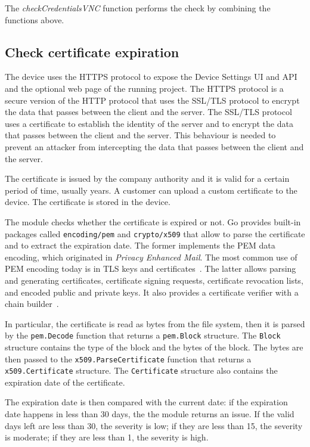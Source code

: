 The \textit{checkCredentialsVNC} function performs the check by combining the functions above.

\subsection{Check certificate expiration}

The device uses the HTTPS protocol to expose the Device Settings UI and API and the optional web page of the running project. The HTTPS protocol is a secure version of the HTTP protocol that uses the SSL/TLS protocol to encrypt the data that passes between the client and the server. The SSL/TLS protocol uses a certificate to establish the identity of the server and to encrypt the data that passes between the client and the server. This behaviour is needed to prevent an attacker from intercepting the data that passes between the client and the server.

The certificate is issued by the company authority and it is valid for a certain period of time, usually years. A customer can upload a custom certificate to the device. The certificate is stored in the device.

The module checks whether the certificate is expired or not. Go provides built-in packages called \texttt{encoding/pem} and \texttt{crypto/x509} that allow to parse the certificate and to extract the expiration date. The former implements the PEM data encoding, which originated in \textit{Privacy Enhanced Mail}. The most common use of PEM encoding today is in TLS keys and certificates~\cite{go-package-pem}. The latter allows parsing and generating certificates, certificate signing requests, certificate revocation lists, and encoded public and private keys. It also provides a certificate verifier with a chain builder~\cite{go-package-x509}.

In particular, the certificate is read as bytes from the file system, then it is parsed by the \texttt{pem.Decode} function that returns a \texttt{pem.Block} structure. The \texttt{Block} structure contains the type of the block and the bytes of the block. The bytes are then passed to the \texttt{x509.ParseCertificate} function that returns a \texttt{x509.Certificate} structure. The \texttt{Certificate} structure also contains the expiration date of the certificate.

The expiration date is then compared with the current date: if the expiration date happens in less than 30 days, the the module returns an issue. If the valid days left are less than 30, the severity is low; if they are less than 15, the severity is moderate; if they are less than 1, the severity is high.

